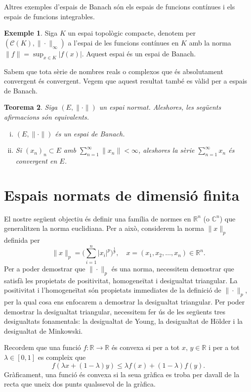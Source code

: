 \documentclass[12pt]{book}
\newtheorem{teorema}{Teorema}[chapter]
\theoremstyle{definition}
\theoremstyle{nota}
\theoremstyle{exemple}
\newtheorem{exemple}[teorema]{Exemple}
\begin{document}
Altres exemples d'espais de Banach són els espais de funcions
contínues i els espais de funcions integrables.

\begin{exemple}
  Siga $K$ un espai topològic compacte, denotem per
  $(\mathcal{C}(K), \|\cdot\|_\infty)$ a l'espai de les funcions
  contínues en $K$ amb la norma $\|f\| = \sup_{x \in K}
  |f(x)|$. Aquest espai és un espai de Banach.
\end{exemple}

Sabem que tota sèrie de nombres reals o complexos que és absolutament
convergent és convergent. Vegem que aquest resultat també es vàlid per
a espais de Banach.

\begin{teorema}
  Siga $(E, \|\cdot\|)$ un espai normat. Aleshores, les següents
  afirmacions són equivalents.
  \begin{enumerate}[(i), nosep]
  \item $(E, \|\cdot\|)$ és un espai de Banach.
  \item Si $(x_n)_n \subset E$ amb
    $\sum_{n=1}^{\infty} \|x_n\| < \infty$, aleshores la sèrie
    $\sum_{n=1}^{\infty} x_n$ és convergent en $E$.
  \end{enumerate}
\end{teorema}

\section{Espais normats de dimensió finita}

El nostre següent objectiu és definir una família de normes en
$\mathbb{R}^n$ (o $\mathbb{C}^n$) que generalitzen la norma
euclidiana. Per a això, considerem la norma $\|x\|_p$ definida per
\[
  \|x\|_p = \Big( \sum_{i=1}^{n} |x_i|^p \Big)^{\frac{1}{p}},
  \quad x = (x_1, x_2, \dotsc, x_n) \in \mathbb{R}^n.
\]
Per a poder demostrar que $\|\cdot\|_p$ és una norma, necessitem
demostrar que satisfà les propietats de positivitat, homogeneïtat i
desigualtat triangular. La positivitat i l'homogeneïtat són propietats
immediates de la definició de $\|\cdot\|_p$, per la qual cosa ens
enfocarem a demostrar la desigualtat triangular. Per poder demostrar
la desigualtat triangular, necessitem fer ús de les següents tres
desigualtats fonamentals: la desigualtat de Young, la desigualtat de
Hölder i la desigualtat de Minkowski.

Recordem que una funció $f : \mathbb{R} \to \mathbb{R}$ és convexa si
per a tot $x, \, y \in \mathbb{R}$ i per a tot $\lambda \in [0,1]$ es
compleix que
\[
  f(\lambda x + (1-\lambda) y) \leq \lambda f(x) + (1-\lambda) f(y).
\]
Gràficament, una funció és convexa si la seua gràfica es troba per
davall de la recta que uneix dos punts qualssevol de la gràfica.
\end{document}
